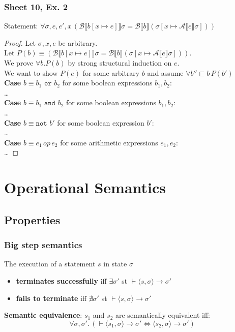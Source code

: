 \documentclass[11.5pt]{article}
\def\li{\rightarrow}
\def\A{\mathcal{A}}
\def\B{\mathcal{B}}
\def\nott{\texttt{not }}
\def\andt{\texttt{ and }}
\def\ort{\texttt{ or }}
\def\llb{\llbracket}
\def\rrb{\rrbracket}
\def\la{\langle}
\def\ra{\rangle}
\begin{document}
\subsubsection{Sheet 10, Ex. 2}
Statement: $ \forall \sigma, e, e', x \, (\B \llb b [x \mapsto e]\rrb \sigma = \B \llb b\rrb (\sigma[x \mapsto \A \llb e \rrb \sigma]))$
\begin{proof}
    Let $\sigma, x, e$ be arbitrary. \\
    Let $P(b) \equiv (\B \llb b [x \mapsto e]\rrb \sigma = \B \llb b\rrb (\sigma[x \mapsto \A \llb e \rrb \sigma]))$.\\
    We prove $\forall b. P(b)$ by strong structural induction on $e$. \\
    We want to show $P(e)$ for some arbitrary $b$ and assume $\forall b''  \sqsubset b \, P(b')$ \\
    \textbf{Case} $b \equiv b_1 \ort b_2$ for some boolean expressions $b_1,b_2$:\\
    \dots \\
    \textbf{Case} $b \equiv b_1 \andt b_2$ for some boolean expressions $b_1,b_2$:\\
    \dots \\
    \textbf{Case} $b \equiv \nott b'$ for some boolean expression $b'$:\\
    \dots \\
    \textbf{Case} $b \equiv e_1 \, op \, e_2$ for some arithmetic expressions $e_1, e_2$:\\
    \dots 
\end{proof}

\section{Operational Semantics}
\subsection{Properties}
\subsubsection{Big step semantics}
The execution of a statement $s$ in state $\sigma$
\begin{itemize}
    \item \textbf{terminates successfully} iff $\exists \sigma'$ st $\vdash \langle s, \sigma \rangle \li \sigma'$ 
    \item \textbf{fails to terminate} iff $\nexists \sigma'$ st $\vdash \langle s, \sigma \rangle \li \sigma'$ 
\end{itemize}
\textbf{Semantic equivalence}: $s_1$ and $s_2$ are semantically equivalent iff:
$$\forall \sigma, \sigma'. \, (\vdash \la s_1, \sigma\ra \li \sigma' 
\Leftrightarrow
\la s_2, \sigma\ra \li \sigma' 
 )$$
\end{document}
